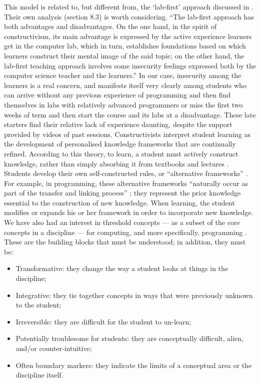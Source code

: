 \documentclass[conference,compsoc]{IEEEtran}
\begin{document}
This model is related to, but different from, the `lab-first' approach discussed in \cite{Hazzan}. Their own analysis (section 8.3) is worth considering. ``The lab-first approach has both advantages and disadvantages. On the one hand, in the spirit of constructivism, its main advantage is expressed by the active experience learners get in the computer lab, which in turn, establishes foundations based on which learners construct their mental image of the said topic; on the other hand, the lab-first teaching approach involves some insecurity feelings expressed both by the computer science teacher and the learners.'' In our case, insecurity among the learners is a real concern, and manifests itself very clearly among students who can arrive without any previous experience of programming and then find themselves in labs with relatively advanced programmers or miss the first two weeks of term and then start the course and its labs at a disadvantage. These late starters find their relative lack of experience daunting, despite the support provided by videos of past sessions.
Constructivists interpret student learning as the development of personalised knowledge frameworks that are continually refined. According to this theory, to learn, a student must actively construct knowledge, rather than simply absorbing it from textbooks and lectures \cite{Meyer}.  Students develop their own self-constructed rules, or ``alternative frameworks'' \cite{BenAri}. For example, in programming, these alternative frameworks ``naturally occur as part of the transfer and linking process'' \cite{Clancy}; they represent the prior knowledge essential to the construction of new knowledge. When learning, the student modifies or expands his or her framework in order to incorporate new knowledge. We have also had an interest in threshold concepts \cite{Land,Meyer} --- as a subset of the core concepts in a discipline --- for computing, and more specifically, programming \cite{Khalife}. These are the building blocks that must be understood; in addition, they must be:
\begin{itemize}
	\item	Transformative: they change the way a student looks at things in the discipline;
	\item	Integrative: they tie together concepts in ways that were previously unknown to the student;
	\item	Irreversible: they are difficult for the student to un-learn;
	\item	Potentially troublesome for students: they are conceptually difficult, alien, and/or counter-intuitive;
	\item	Often boundary markers: they indicate the limits of a conceptual area or the discipline itself.
\end{itemize}
\end{document}
